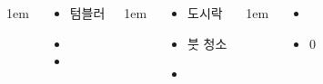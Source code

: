 \documentclass[25pt, a0paper ]{tikzposter}
\begin{document}
\begin{columns}
			{
					\setlength{\leftmargini}{4em}
					\setlength{\labelsep} {1em}
				\begin{LARGE}
					\begin{itemize}
					\item 텀블러
					\item 
					\item 
					\end{itemize}
				\end{LARGE}
			}

			{
					\setlength{\leftmargini}{4em}
					\setlength{\labelsep} {1em}
				\begin{LARGE}
					\begin{itemize}
					\item 도시락
					\item 붓 청소
					\item 
					\end{itemize}
				\end{LARGE}
			}

			{
					\setlength{\leftmargini}{4em}
					\setlength{\labelsep} {1em}
				\begin{LARGE}
					\begin{itemize}
					\item 
					\item 0
					\end{itemize}
				\end{LARGE}
			}



	\end{columns}
\end{document}
